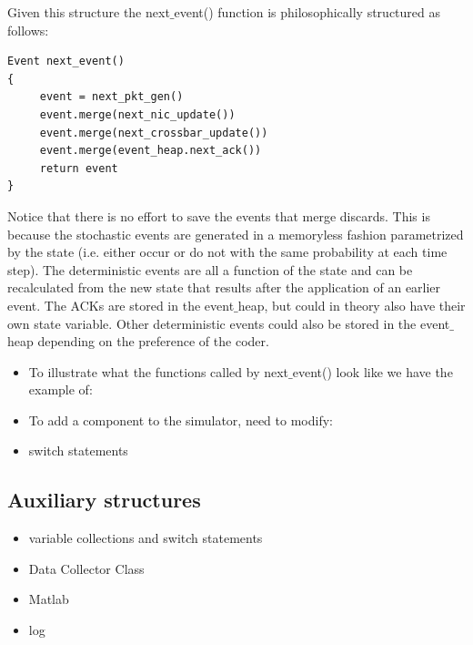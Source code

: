 \documentclass{IEEEtran}%
\begin{document}
Given this structure the next$\_$event() function is philosophically structured as follows:

\begin{verbatim}
Event next_event()
{
     event = next_pkt_gen()
     event.merge(next_nic_update())
     event.merge(next_crossbar_update())
     event.merge(event_heap.next_ack())
     return event
}
\end{verbatim}

Notice that there is no effort to save the events that merge discards.  This is because the stochastic events are generated in a memoryless fashion parametrized by the state (i.e. either occur or do not with the same probability at each time step).  The deterministic events are all a function of the state and can be recalculated from the new state that results after the application of an earlier event.  The ACKs are stored in the event$\_$heap, but could in theory also have their own state variable.  Other deterministic events could also be stored in the event$\_$heap depending on the preference of the coder.


\begin{itemize}
\item To illustrate what the functions called by next$\_$event() look like we have the example of:
\item To add a component to the simulator, need to modify:
\item switch statements 
\end{itemize}
\subsection{Auxiliary structures}
\begin{itemize}
\item variable collections and switch statements
\item Data Collector Class
\item Matlab
\item log
\end{itemize}
\end{document}
